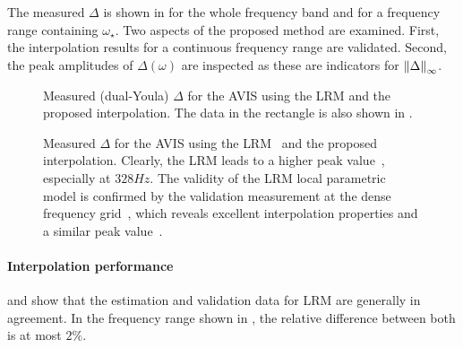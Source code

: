 The measured $\Delta$ is shown in  for the whole frequency band and  for a frequency range containing $\omega_{\star}$.
Two aspects of the proposed method are examined.
First, the interpolation results for a continuous frequency range are validated.
Second, the peak amplitudes of $\Delta(\omega)$ are inspected as these are  indicators for $\left\| \Delta \right\|_{\infty}$.

\begin{figure}
 \centering
    \setlength{\figurewidth}{0.75\columnwidth}
    \setlength{\figureheight}{0.68\figurewidth}
 \caption[$\Delta$ of the , estimated using local modeling.]{Measured (dual-Youla) $\Delta$ for the \gls{AVIS} using the \gls{LRM} and the proposed interpolation. The data in the rectangle is also shown in .}
\label{fig:avisMeas}
\end{figure}

\begin{figure}
 \centering
    \setlength{\figurewidth}{0.75\columnwidth}
    \setlength{\figureheight}{0.68\figurewidth}
   
 \caption[$\Delta$ of the , estimated using local modeling (detail).]{Measured $\Delta$ for the \gls{AVIS} using the \gls{LRM}~ and the proposed interpolation. Clearly, the \gls{LRM} leads to a higher peak value~, especially at $328\unit{Hz}$. The validity of the LRM local parametric model is confirmed by the validation measurement at the dense frequency grid~, which reveals excellent interpolation properties and a similar peak value~.}
\label{fig:avisMeasZoom}
\end{figure}

\vspace{-2em}
\paragraph*{Interpolation performance}
\label{sec:avis-interpol}
 and  show that the estimation and validation data for \gls{LRM} are generally in agreement.
In the frequency range shown in , the relative difference between both is at most $2\%$.

\vspace{-2em}
